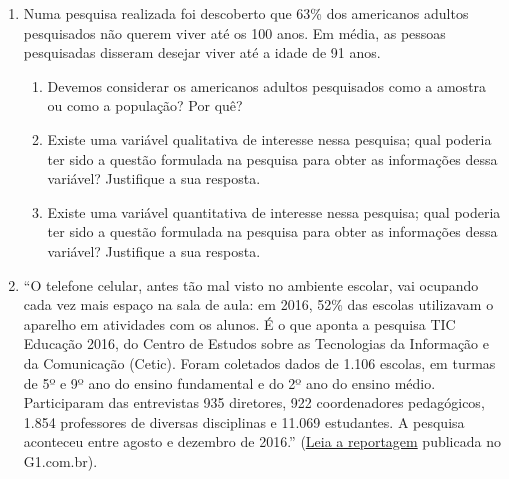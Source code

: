 {{\begin{enumerate}
\begin{enumerate}
\item {} 
Os indivíduos são classificados como abaixo do peso, normais ou acima do peso e suas pressões sanguíneas são registradas.

\item {} 
Os indivíduos são classificados como tendo pressão alta, normal ou baixa e seus pesos são registrados.

\item {} 
Os indivíduos são classificados como abaixo do peso, normais ou acima do peso e como tendo pressão alta, normal ou baixa.

\end{enumerate}

\item Numa pesquisa realizada foi descoberto que 63\% dos americanos adultos pesquisados não querem viver até os 100 anos. Em média, as pessoas pesquisadas disseram desejar viver até a idade de 91 anos.
\begin{enumerate}
\item {} 
Devemos considerar os americanos adultos pesquisados como a amostra ou como a população? Por quê?

\item {} 
Existe uma variável qualitativa de interesse nessa pesquisa; qual poderia ter sido a questão formulada na pesquisa para obter as informações dessa variável? Justifique a sua resposta.

\item {} 
Existe uma variável quantitativa de interesse nessa pesquisa; qual poderia ter sido a questão formulada na pesquisa para obter as informações dessa variável? Justifique a sua resposta.

\end{enumerate}

\item ``O telefone celular, antes tão mal visto no ambiente escolar, vai ocupando cada vez mais espaço na sala de aula: em 2016, 52\% das escolas utilizavam o aparelho em atividades com os alunos. É o que aponta a pesquisa TIC Educação 2016, do Centro de Estudos sobre as Tecnologias da Informação e da Comunicação (Cetic).
Foram coletados dados de 1.106 escolas, em turmas de 5º e 9º ano do ensino fundamental e do 2º ano do ensino médio. Participaram das entrevistas 935 diretores, 922 coordenadores pedagógicos, 1.854 professores de diversas disciplinas e 11.069 estudantes. A pesquisa aconteceu entre agosto e dezembro de 2016.'' (\href{https://g1.globo.com/educacao/notici/52-das-instituicoes-de-educacao-basica-usam-celular-em-atividades-escolares-aponta-estudo-da-cetic.gtml}{Leia a reportagem} publicada no G1.com.br).


\end{enumerate}}}
